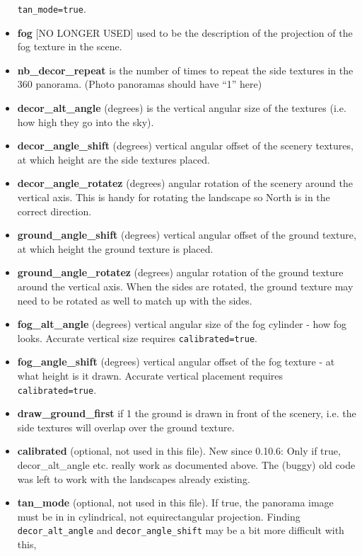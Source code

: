 \begin{itemize}
  \texttt{tan\_mode=true}.
\item
  \textbf{fog} {[}NO LONGER USED{]} used to be the description of the
  projection of the fog texture in the scene.
\item
  \textbf{nb\_decor\_repeat} is the number of times to repeat the side
  textures in the 360 panorama. (Photo panoramas should have ``1'' here)
\item
  \textbf{decor\_alt\_angle} (degrees) is the vertical angular size of
  the textures (i.e. how high they go into the sky).
\item
  \textbf{decor\_angle\_shift} (degrees) vertical angular offset of the
  scenery textures, at which height are the side textures placed.
\item
  \textbf{decor\_angle\_rotatez} (degrees) angular rotation of the
  scenery around the vertical axis. This is handy for rotating the
  landscape so North is in the correct direction.
\item
  \textbf{ground\_angle\_shift} (degrees) vertical angular offset of the
  ground texture, at which height the ground texture is placed.
\item
  \textbf{ground\_angle\_rotatez} (degrees) angular rotation of the
  ground texture around the vertical axis. When the sides are rotated,
  the ground texture may need to be rotated as well to match up with the
  sides.
\item
  \textbf{fog\_alt\_angle} (degrees) vertical angular size of the fog
  cylinder - how fog looks. Accurate vertical size requires
  \texttt{calibrated=true}.
\item
  \textbf{fog\_angle\_shift} (degrees) vertical angular offset of the
  fog texture - at what height is it drawn. Accurate vertical placement
  requires \texttt{calibrated=true}.
\item
  \textbf{draw\_ground\_first} if 1 the ground is drawn in front of the
  scenery, i.e. the side textures will overlap over the ground texture.
\item
  \textbf{calibrated} (optional, not used in this file). New since
  0.10.6: Only if true, decor\_alt\_angle etc. really work as documented
  above. The (buggy) old code was left to work with the landscapes
  already existing.
\item
  \textbf{tan\_mode} (optional, not used in this file). If true, the
  panorama image must be in in cylindrical, not equirectangular
  projection. Finding \texttt{decor\_alt\_angle} and
  \texttt{decor\_angle\_shift} may be a bit more difficult with this,

\end{itemize}
